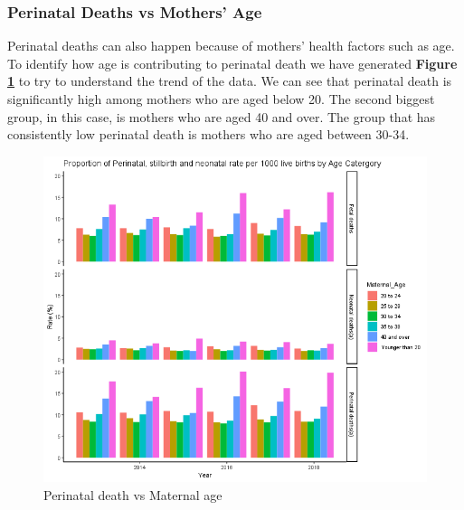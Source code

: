 \subsubsection{Perinatal Deaths vs Mothers' Age}
Perinatal deaths can also happen because of mothers' health factors such as age. To identify how age is contributing to perinatal death we have generated \textbf{Figure \ref{fig:peri_mother}} to try to understand the trend of the data. We can see that perinatal death is significantly high among mothers who are aged below 20. The second biggest group, in this case, is mothers who are aged 40 and over. The group that has consistently low perinatal death is mothers who are aged between 30-34.
\begin{figure}
  \centering
  \includegraphics[width=.75\textwidth]{subsections/perinatal_deaths/by_mother_age_baby_death.png}
  \caption{Perinatal death vs Maternal age}
  \label{fig:peri_mother}
\end{figure}
